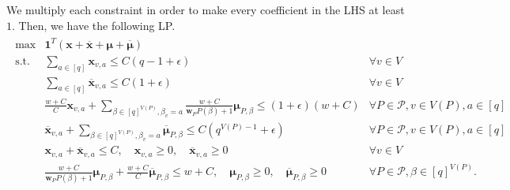 \documentclass[letterpaper, 11pt]{article}
\newcommand{\calP}{\mathcal{P}}
\newcommand{\biw}{\boldsymbol{w}}
\newcommand{\bix}{\boldsymbol{x}}
\newcommand{\bimu}{\boldsymbol{\mu}}
\begin{document}
We multiply each constraint in order to make every coefficient in the LHS at least $1$.
Then, we have the following LP.
\begin{eqnarray}
  \begin{array}{lll}
    \max & \mathbf{1}^T(\bix+\overline{\bix}+\bimu+\overline{\bimu}) \\
    \mbox{s.t.} & \sum\limits_{a\in[q]}\bix_{v,a} \leq C(q-1 + \epsilon) & \forall v \in V\\    
    & \sum\limits_{a\in[q]}\overline{\bix}_{v,a} \leq C(1+\epsilon) & \forall v\in V\\    
    & \frac{w+C}{C}\bix_{v,a}+\sum\limits_{\beta \in [q]^{V(P)}, \beta_v=a}\frac{w+C}{\biw_PP(\beta)+1}\bimu_{P,\beta} \leq (1+\epsilon)(w+C) & \forall P\in \calP, v\in V(P), a\in [q]\\
    & \overline{\bix}_{v,a}+\sum\limits_{\beta \in [q]^{V(P)}, \beta_v=a}\overline{\bimu}_{P,\beta} \leq C(q^{V(P)-1}+\epsilon) & \forall P\in \calP, v\in V(P), a\in [q]\\
    & \bix_{v,a}+\overline{\bix}_{v,a} \leq C, \quad \bix_{v,a}\geq 0, \quad \overline{\bix}_{v,a}\geq 0 & \forall v \in V\\
    & \frac{w+C}{\biw_PP(\beta)+1}\bimu_{P,\beta}+\frac{w+C}{C}\overline{\bimu}_{P,\beta} \leq w+C, \quad \bimu_{P,\beta}\geq 0, \quad \overline{\bimu}_{P,\beta}\geq 0 & \forall P\in \calP, \beta\in [q]^{V(P)}.\\
  \end{array}
  \label{lp:blp-super-relaxed}
\end{eqnarray}
\end{document}
